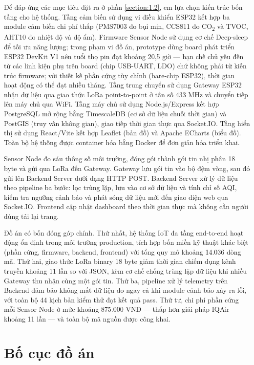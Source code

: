 \documentclass[../DoAn.tex]{subfiles}
\begin{document}
Để đáp ứng các mục tiêu đặt ra ở phần \ref{section:1.2}, em lựa chọn kiến trúc bốn tầng cho hệ thống. Tầng cảm biến sử dụng vi điều khiển ESP32 kết hợp ba module cảm biến chi phí thấp (PMS7003 đo bụi mịn, CCS811 đo CO\textsubscript{2} và TVOC, AHT10 đo nhiệt độ và độ ẩm). Firmware Sensor Node sử dụng cơ chế Deep-sleep để tối ưu năng lượng; trong phạm vi đồ án, prototype dùng board phát triển ESP32 DevKit V1 nên tuổi thọ pin đạt khoảng 20,5 giờ — hạn chế chủ yếu đến từ các linh kiện phụ trên board (chip USB-UART, LDO) chứ không phải từ kiến trúc firmware; với thiết kế phần cứng tùy chỉnh (bare-chip ESP32), thời gian hoạt động có thể đạt nhiều tháng. Tầng trung chuyển sử dụng Gateway ESP32 nhận dữ liệu qua giao thức \gls{LoRa} point-to-point ở tần số 433 MHz và chuyển tiếp lên máy chủ qua WiFi. Tầng máy chủ sử dụng Node.js/Express kết hợp PostgreSQL mở rộng bằng TimescaleDB (cơ sở dữ liệu chuỗi thời gian) và PostGIS (truy vấn không gian), giao tiếp thời gian thực qua Socket.IO. Tầng hiển thị sử dụng React/Vite kết hợp Leaflet (bản đồ) và Apache ECharts (biểu đồ). Toàn bộ hệ thống được container hóa bằng Docker để đơn giản hóa triển khai.

Sensor Node đo sáu thông số môi trường, đóng gói thành gói tin nhị phân 18 byte và gửi qua \gls{LoRa} đến Gateway. Gateway lưu gói tin vào bộ đệm vòng, sau đó gửi lên Backend Server dưới dạng HTTP POST. Backend Server xử lý dữ liệu theo pipeline ba bước: lọc trùng lặp, lưu vào cơ sở dữ liệu và tính chỉ số \gls{AQI}, kiểm tra ngưỡng cảnh báo và phát sóng dữ liệu mới đến giao diện web qua Socket.IO. Frontend cập nhật dashboard theo thời gian thực mà không cần người dùng tải lại trang.

Đồ án có bốn đóng góp chính. Thứ nhất, hệ thống \gls{IoT} đa tầng end-to-end hoạt động ổn định trong môi trường production, tích hợp bốn miền kỹ thuật khác biệt (phần cứng, firmware, backend, frontend) với tổng quy mô khoảng 14.036 dòng mã. Thứ hai, giao thức \gls{LoRa} binary 18 byte giảm thời gian chiếm dụng kênh truyền khoảng 11 lần so với \gls{JSON}, kèm cơ chế chống trùng lặp dữ liệu khi nhiều Gateway thu nhận cùng một gói tin. Thứ ba, pipeline xử lý telemetry trên Backend đảm bảo không mất dữ liệu đo ngay cả khi module cảnh báo xảy ra lỗi, với toàn bộ 44 kịch bản kiểm thử đạt kết quả pass. Thứ tư, chi phí phần cứng mỗi Sensor Node ở mức khoảng 875.000 VNĐ — thấp hơn giải pháp IQAir khoảng 11 lần — và toàn bộ mã nguồn được công khai.

\section{Bố cục đồ án}
\label{section:1.4}
\end{document}
